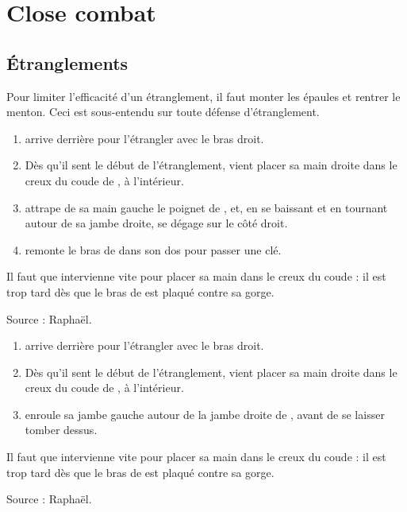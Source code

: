 \chapter{Close combat}




\section{Étranglements}

Pour limiter l'efficacité d'un étranglement, il faut monter les épaules et rentrer le menton.
Ceci est sous-entendu sur toute défense d'étranglement.


\begin{technique}

\begin{enumerate}
	\item \A arrive derrière \D pour l'étrangler avec le bras droit.
	
	\item Dès qu'il sent le début de l'étranglement, \D vient placer sa main droite dans le creux du coude de \A, à l'intérieur.
	
	\item \D attrape de sa main gauche le poignet de \A, et, en se baissant et en tournant autour de sa jambe droite, se dégage sur le côté droit.
	
	\item \D remonte le bras de \A dans son dos pour passer une clé.
\end{enumerate}

Il faut que \D intervienne vite pour placer sa main dans le creux du coude : il est trop tard dès que le bras de \A est plaqué contre sa gorge.

Source : Raphaël.

\end{technique}


\begin{technique}

\begin{enumerate}
	\item \A arrive derrière \D pour l'étrangler avec le bras droit.
	
	\item Dès qu'il sent le début de l'étranglement, \D vient placer sa main droite dans le creux du coude de \A, à l'intérieur.
	
	\item {} \D enroule sa jambe gauche autour de la jambe droite de \A, avant de se laisser tomber dessus.
\end{enumerate}

Il faut que \D intervienne vite pour placer sa main dans le creux du coude : il est trop tard dès que le bras de \A est plaqué contre sa gorge.

Source : Raphaël.

\end{technique}



